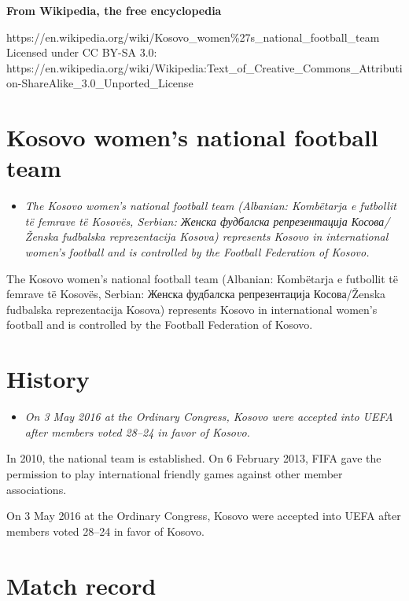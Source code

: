 \textbf{From Wikipedia, the free encyclopedia}

https://en.wikipedia.org/wiki/Kosovo\_women\%27s\_national\_football\_team\\
Licensed under CC BY-SA 3.0:\\
https://en.wikipedia.org/wiki/Wikipedia:Text\_of\_Creative\_Commons\_Attribution-ShareAlike\_3.0\_Unported\_License

\section{Kosovo women's national football
team}\label{kosovo-womens-national-football-team}

\begin{itemize}
\item
  \emph{The Kosovo women's national football team (Albanian: Kombëtarja
  e futbollit të femrave të Kosovës, Serbian: Женска фудбалска
  репрезентација Косова/Ženska fudbalska reprezentacija Kosova)
  represents Kosovo in international women's football and is controlled
  by the Football Federation of Kosovo.}
\end{itemize}

The Kosovo women's national football team (Albanian: Kombëtarja e
futbollit të femrave të Kosovës, Serbian: Женска фудбалска
репрезентација Косова/Ženska fudbalska reprezentacija Kosova) represents
Kosovo in international women's football and is controlled by the
Football Federation of Kosovo.

\section{History}\label{history}

\begin{itemize}
\item
  \emph{On 3 May 2016 at the Ordinary Congress, Kosovo were accepted
  into UEFA after members voted 28--24 in favor of Kosovo.}
\end{itemize}

In 2010, the national team is established. On 6 February 2013, FIFA gave
the permission to play international friendly games against other member
associations.

On 3 May 2016 at the Ordinary Congress, Kosovo were accepted into UEFA
after members voted 28--24 in favor of Kosovo.

\section{Match record}\label{match-record}

